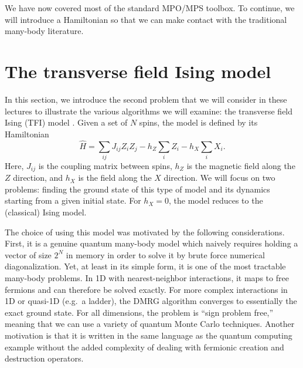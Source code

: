 \documentclass{SciPost}
\begin{document}
We have now covered most of the standard MPO/MPS toolbox. To continue, we will introduce a
Hamiltonian so that we can make contact with the traditional many-body literature.

\section{The transverse field Ising model}
\label{sec:tfi}

In this section, we introduce the second problem that we will consider in these lectures to illustrate the various algorithms we will examine: the transverse field Ising (TFI) model \cite{pfeuty1970}. Given a set
of $N$ spins, the model is defined by its Hamiltonian
\begin{equation}
\hat H = \sum_{ij} J_{ij} Z_i Z_j - h_Z \sum_i Z_i - h_X \sum_i X_i.
\end{equation}
Here, $J_{ij}$ is the coupling matrix between spins, $h_Z$ is the magnetic field along
the $Z$ direction, and $h_X$ is the field along the $X$ direction. We will focus on two problems: finding the ground state of this type of model and its dynamics starting from a given initial state. For $h_X=0$, the model reduces to the (classical) Ising model.

The choice of using this model was motivated by the following considerations. First, it is
a genuine quantum many-body model which naively requires holding a vector of size $2^N$ in memory in order to solve it by brute force numerical diagonalization. Yet, at least in its simple form, it is one of the most tractable many-body problems. In 1D with nearest-neighbor interactions, it maps to free fermions and can therefore be solved exactly. For more complex interactions in 1D or quasi-1D (e.g.\ a ladder), the DMRG algorithm converges to essentially the exact ground state. For all dimensions, the problem is ``sign problem free,'' meaning that we can use a variety of quantum Monte Carlo techniques. Another motivation is that it is written in the same language as the quantum computing example without the added complexity of dealing with fermionic creation and destruction operators.
\end{document}

